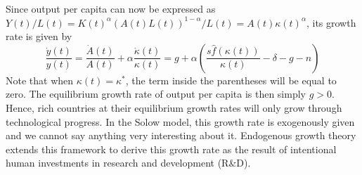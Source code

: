 \documentclass[\topdir/lecture\_notes.tex]{subfiles}
\begin{document}
Since output per capita can now be expressed as \(Y(t) / L(t)=K(t)^{\alpha}(A(t) L(t))^{1-\alpha} / L(t)=A(t) \kappa(t)^{\alpha}\), its growth rate is given by
\begin{equation}
  \frac{\dot{y}(t)}{y(t)}=\frac{\dot{A}(t)}{A(t)}+\alpha \frac{\dot{\kappa}(t)}{\kappa(t)}=g+\alpha\left(\frac{s \hat{f}(\kappa(t))}{\kappa(t)}-\delta-g-n\right)
  \label{eq:solow-output-growth-tech}
\end{equation}
Note that when \(\kappa(t)=\kappa^{*}\), the term inside the parentheses will be equal to zero.
The equilibrium growth rate of output per capita is then simply \(g>0\).
Hence, rich countries at their equilibrium growth rates will only grow through technological progress.
In the Solow model, this growth rate is exogenously given and we cannot say anything very interesting about it.
Endogenous growth theory extends this framework to derive this growth rate as the result of intentional human investments in research and development (R\&D).


  
  
  
  
  
\end{document}
